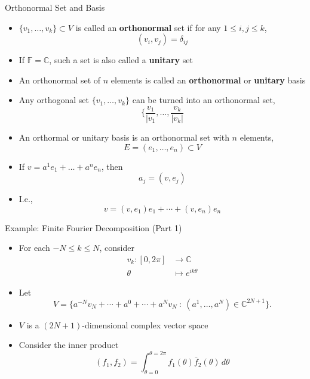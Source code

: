 \documentclass[usenames,dvipsnames,10pt]{beamer}
\newcommand\C{\mathbb{C}}
\newcommand\F{\mathbb{F}}
\begin{document}
\begin{frame}
  {Orthonormal Set and Basis}

  \begin{itemize}
  \item $\{v_1, \dots, v_k\} \subset V$ is called an {\bf orthonormal} set if for any $1 \le i,j \le k$,
    \[
      (v_i,v_j) = \delta_{ij}
    \]
  \item If $\F = \C$, such a set is also called a {\bf unitary} set
  \item An orthonormal set of $n$ elements is called an {\bf orthonormal} or {\bf unitary} basis
  \item Any orthogonal set $\{ v_1, \dots, v_k \}$ can be turned into an orthonormal set,
    \[
      \{ \frac{v_1}{|v_1}, \dots, \frac{v_k}{|v_k|}
    \]
  \item An orthormal or unitary basis is an orthonormal set with $n$ elements,
    \[
      E = (e_1, \dots, e_n) \subset V
    \]
  \item If $v = a^1e_1 + \dots + a^ne_n$, then
    \[
      a_j = (v,e_j)
    \]
  \item I.e.,
    \[
      v = (v,e_1)e_1 + \cdots + (v,e_n)e_n
    \]
  \end{itemize}
\end{frame}

\begin{frame}
  {Example: Finite Fourier Decomposition (Part 1)}

  \begin{itemize}
  \item For each $-N \le k \le N$, consider
    \begin{align*}
      v_k: [0,2\pi] &\rightarrow \C\\
      \theta &\mapsto e^{ik\theta}
    \end{align*}
  \item Let
    \[
      V = \{ a^{-N}v_N + \cdots + a^0 + \cdots + a^Nv_N\ :\ (a^1, \dots, a^N)\in \C^{2N+1} \}.
    \]
  \item $V$ is a $(2N+1)$-dimensional complex vector space
  \item Consider the inner product
    \[
      (f_1,f_2) = \int_{\theta=0}^{\theta=2\pi} f_1(\theta)\bar{f}_2(\theta)\,d\theta
    \]
  \end{itemize}
\end{frame}
\end{document}
